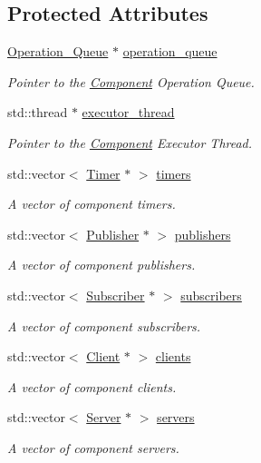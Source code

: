 \subsection*{Protected Attributes}
\begin{DoxyCompactItemize}
\item 
\hyperlink{classzcm_1_1Operation__Queue}{Operation\-\_\-\-Queue} $\ast$ \hyperlink{classzcm_1_1Component_a4c9f3591c18dde89bc3c2af7717c6692}{operation\-\_\-queue}
\begin{DoxyCompactList}\small\item\em Pointer to the \hyperlink{classzcm_1_1Component}{Component} Operation Queue. \end{DoxyCompactList}\item 
std\-::thread $\ast$ \hyperlink{classzcm_1_1Component_a392ca3b6cd537cd7aa1d4db31dacdf4d}{executor\-\_\-thread}
\begin{DoxyCompactList}\small\item\em Pointer to the \hyperlink{classzcm_1_1Component}{Component} Executor Thread. \end{DoxyCompactList}\item 
std\-::vector$<$ \hyperlink{classzcm_1_1Timer}{Timer} $\ast$ $>$ \hyperlink{classzcm_1_1Component_a506eac4aebc9e02f0df246afbbac7d75}{timers}
\begin{DoxyCompactList}\small\item\em A vector of component timers. \end{DoxyCompactList}\item 
std\-::vector$<$ \hyperlink{classzcm_1_1Publisher}{Publisher} $\ast$ $>$ \hyperlink{classzcm_1_1Component_a4dcce63b0b5495bc15bd18e5dce86094}{publishers}
\begin{DoxyCompactList}\small\item\em A vector of component publishers. \end{DoxyCompactList}\item 
std\-::vector$<$ \hyperlink{classzcm_1_1Subscriber}{Subscriber} $\ast$ $>$ \hyperlink{classzcm_1_1Component_a9f9e58fb5d2189b183ffd22ce905d620}{subscribers}
\begin{DoxyCompactList}\small\item\em A vector of component subscribers. \end{DoxyCompactList}\item 
std\-::vector$<$ \hyperlink{classzcm_1_1Client}{Client} $\ast$ $>$ \hyperlink{classzcm_1_1Component_a940e1b9755cd9f2bea95bda880999626}{clients}
\begin{DoxyCompactList}\small\item\em A vector of component clients. \end{DoxyCompactList}\item 
std\-::vector$<$ \hyperlink{classzcm_1_1Server}{Server} $\ast$ $>$ \hyperlink{classzcm_1_1Component_a1d99508f165f7014b190d2fbe4ad2271}{servers}
\begin{DoxyCompactList}\small\item\em A vector of component servers. \end{DoxyCompactList}\end{DoxyCompactItemize}


